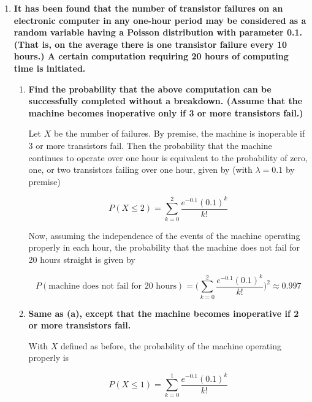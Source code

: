 \documentclass[10pt, oneside]{article}   	%
\theoremstyle{definition}
\begin{document}
\begin{enumerate}[label=8.\arabic*]
\item  \begin{tcolorbox}[
  colback=Cerulean!5!white,
  colframe=Cerulean!75!black]
\textbf{It has been found that the number of transistor failures on an electronic computer in any one-hour period may be considered as a random variable having a Poisson distribution with parameter 0.1. (That is, on the average there is one transistor failure every 10 hours.) A certain computation requiring 20 hours of computing time is initiated.}
\end{tcolorbox}
	
	\begin{enumerate}
	\item  \begin{tcolorbox}[
	  colback=Cerulean!5!white,
	  colframe=Cerulean!75!black]
	\textbf{Find the probability that the above computation can be successfully completed without a breakdown. (Assume that the machine becomes inoperative only if 3 or more transistors fail.)}
	\end{tcolorbox}
	
	Let $X$ be the number of failures. By premise, the machine is inoperable if 3 or more transistors fail. Then the probability that the machine continues to operate over one hour is equivalent to the probability of zero, one, or two transistors failing over one hour, given by (with $\lambda = 0.1$ by premise)
	
	\[ P(X \leq 2) = \sum^2_{k = 0} \frac{e^{-0.1} (0.1)^k}{k!} \]
	
	Now, assuming the independence of the events of the machine operating properly in each hour, the probability that the machine does not fail for 20 hours straight is given by
	
	\[ P(\text{machine does not fail for 20 hours}) = \Bigg( \sum^2_{k=0} \frac{e^{-0.1} (0.1)^k}{k!} \Bigg)^2 \approx \boxed{0.997} \]
	
	\item  \begin{tcolorbox}[
	  colback=Cerulean!5!white,
	  colframe=Cerulean!75!black]
	\textbf{Same as (a), except that the machine becomes inoperative if 2 or more transistors fail.}
	\end{tcolorbox}
	
	With $X$ defined as before, the probability of the machine operating properly is
	
	\[ P(X \leq 1) = \sum^1_{k = 0} \frac{e^{-0.1} (0.1)^k}{k!} \]
	

\end{enumerate}
\end{enumerate}
\end{document}
